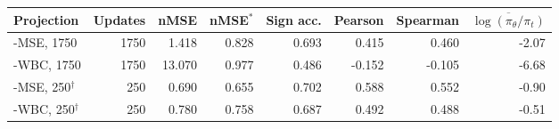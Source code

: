 \begin{tabular}{lrrrrrrr}
\toprule
Projection & Updates & nMSE & nMSE$^\ast$ & Sign acc. & Pearson & Spearman & $\overline{\log(\pi_\theta/\pi_t)}$\\
\midrule
\NBPO{}-MSE, 1750 & 1750 & 1.418 & 0.828 & 0.693 & 0.415 & 0.460 & -2.07\\
\NBPO{}-WBC, 1750 & 1750 & 13.070 & 0.977 & 0.486 & -0.152 & -0.105 & -6.68\\
\NBPO{}-MSE, 250$^\dagger$ & 250 & 0.690 & 0.655 & 0.702 & 0.588 & 0.552 & -0.90\\
\NBPO{}-WBC, 250$^\dagger$ & 250 & 0.780 & 0.758 & 0.687 & 0.492 & 0.488 & -0.51\\
\bottomrule
\end{tabular}
